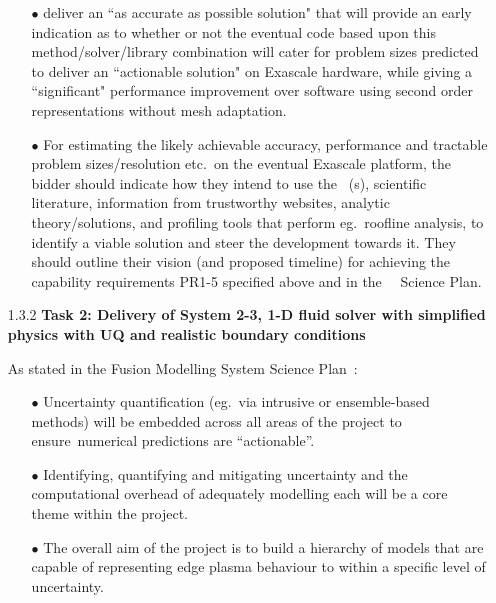 \begin{itemize}
\begin{itemize}
\item[$\bullet$] deliver an ``as accurate as possible solution" that will provide an early indication 
as to whether or not the eventual code based upon this method/solver/library combination will 
cater for problem sizes predicted to deliver an ``actionable solution" on Exascale hardware, 
while giving a ``significant" performance improvement over software using second order representations
without mesh adaptation.
 
\item[$\bullet$] For estimating the likely achievable accuracy, performance and tractable problem sizes/resolution
etc.\ on the eventual Exascale platform, the bidder should indicate how they intend to use the \nep \ \papp(s),
scientific literature, information from trustworthy websites,  analytic theory/solutions, and profiling tools that
perform eg.\  roofline analysis, to identify a viable solution and steer the development towards it.
They should outline their vision (and proposed timeline) for achieving the capability requirements
PR1-5 specified above and in the \exc\ \nep\  Science Plan.


\end{itemize}

\item[1.3.2]\textbf{Task 2: Delivery of System 2-3, 1-D fluid solver with simplified 
physics with UQ and realistic boundary conditions}

As stated in the Fusion Modelling System Science Plan~\cite{sciplan}: 

\begin{itemize}
\item[$\bullet$] Uncertainty quantification (eg.\ via intrusive or ensemble-based methods) 
will be embedded across all areas of the project to ensure~numerical predictions 
are ``actionable''. 

\item[$\bullet$] Identifying, quantifying and mitigating uncertainty and the computational 
overhead of adequately modelling each will be a core theme within the project. 

\item[$\bullet$] The overall aim of the project is to build a hierarchy of models that are 
capable of representing edge plasma behaviour to within a specific level of uncertainty.
\end{itemize}


\end{itemize}
